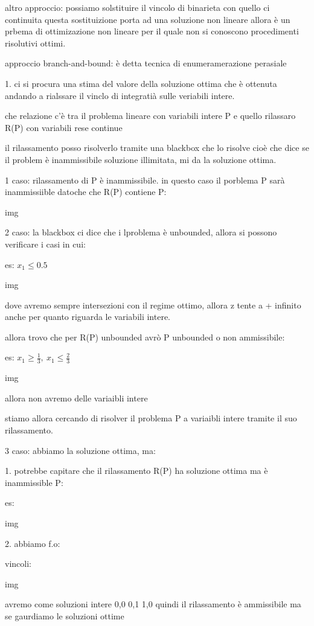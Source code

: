 altro approccio:
possiamo solstituire il vincolo di binarieta con quello ci continuita questa sostituizione porta ad una soluzione non lineare allora è un prbema di ottimizazione non lineare per il quale non si conoscono procedimenti risolutivi ottimi.



approccio branch-and-bound:
è detta tecnica di enumeramerazione perasiale

1. ci si procura una stima del valore della soluzione ottima che è ottenuta andando a rialssare il vinclo di integratià sulle veriabili intere. 

che relazione c'è tra il problema lineare con variabili intere P e quello rilassaro R(P) con variabili rese continue

il rilassamento posso risolverlo tramite una blackbox che lo risolve cioè che dice se il problem è inammissibile soluzione illimitata, mi da la soluzione ottima. 


1 caso: rilassamento di P è inammissibile. in questo caso il porblema P sarà inammissiible datoche che R(P) contiene P:

img

2 caso: la blackbox ci dice che i lproblema è unbounded, allora si possono verificare i casi in cui:

es: $x_1 \leq 0.5$

img

dove avremo sempre intersezioni con il regime ottimo, allora z tente a + infinito anche per quanto riguarda le variabili intere.

allora trovo che per R(P) unbounded avrò P unbounded o non ammissibile:

es: $x_1 \geq \frac{1}{3},\ x_1 \leq \frac{2}{3}$

img

allora non avremo delle variaibli intere




stiamo allora cercando di risolver il problema P a variaibli intere tramite il suo rilassamento.

3 caso: abbiamo la soluzione ottima, ma:

1. potrebbe capitare che il rilassamento R(P) ha soluzione ottima ma è inammissible P:

es:

img

2. abbiamo f.o:

vincoli:

img

avremo come soluzioni intere 0,0 0,1 1,0 quindi il rilassamento è ammissibile ma se gaurdiamo le soluzioni ottime 


